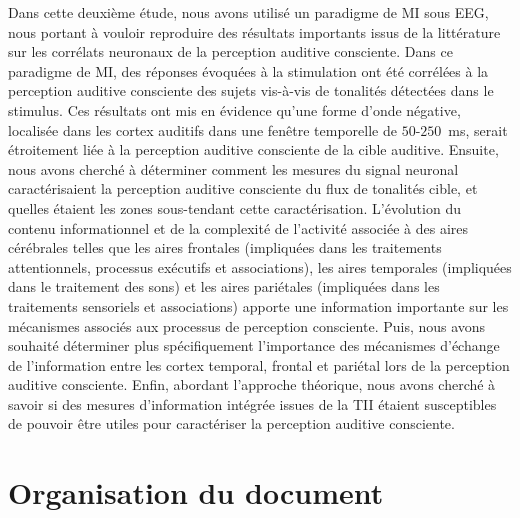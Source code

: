 Dans cette deuxième étude, nous avons utilisé un paradigme de MI sous EEG, nous portant à vouloir reproduire des résultats importants issus de la littérature sur les corrélats neuronaux de la perception auditive consciente. 
Dans ce paradigme de MI, des réponses évoquées à la stimulation ont été corrélées à la perception auditive consciente des sujets vis-à-vis de tonalités détectées dans le stimulus.
Ces résultats ont mis en évidence qu'une forme d'onde négative, localisée dans les cortex auditifs dans une fenêtre temporelle de $50$-$250$~ms, serait étroitement liée à la perception auditive consciente de la cible auditive. 
Ensuite, nous avons cherché à déterminer comment les mesures du signal neuronal caractérisaient la perception auditive consciente du flux de tonalités cible, et quelles étaient les zones sous-tendant cette caractérisation. 
L'évolution du contenu informationnel et de la complexité de l'activité associée à des aires cérébrales telles que les aires frontales (impliquées dans les traitements attentionnels, processus exécutifs et associations), les aires temporales (impliquées dans le traitement des sons) et les aires pariétales (impliquées dans les traitements sensoriels et associations) apporte une information importante sur les mécanismes associés aux processus de perception consciente. 
Puis, nous avons souhaité déterminer plus spécifiquement l'importance des mécanismes d'échange de l'information entre les cortex temporal, frontal et pariétal lors de la perception auditive consciente. 
Enfin, abordant l'approche théorique, nous avons cherché à savoir si des mesures d'information intégrée issues de la TII étaient susceptibles de pouvoir être utiles pour caractériser la perception auditive consciente. 

\section*{Organisation du document}

